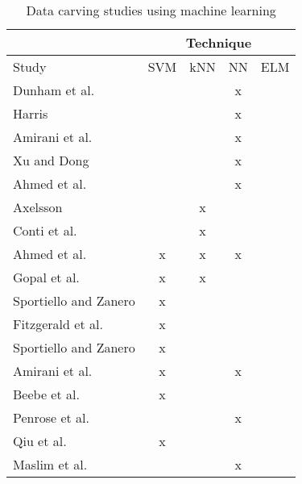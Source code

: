 \begin{table}[!ht]
\caption{Data carving studies using machine learning}
\label{tab:datacarvingstudies}
\begin{tabular}{l|c|c|c|c}

                                & \multicolumn{4}{c}{Technique} \\ \hline
Study                                     & SVM    & kNN    & NN   & ELM   \\ \hline
\hline
Dunham et al. \cite{dunham_classifying_2005} &        &        & x    &       \\ \hline
Harris \cite{harris_using_2007}              &        &        & x    &       \\ \hline
Amirani et al. \cite{amirani_new_2008}       &        &        & x    &       \\ \hline
Xu and Dong \cite{xu_reassembling_2009}      &        &        & x    &       \\ \hline
Ahmed et al. \cite{ahmed_content-based_2010} &        &        & x    &       \\ \hline
Axelsson \cite{axelsson_normalised_2010}     &        & x      &      &       \\ \hline
Conti et al. \cite{conti_automated_2010}     &        & x      &      &       \\ \hline
Ahmed et al. \cite{ahmed_fast_2011}          & x      & x      & x    &       \\ \hline
Gopal et al. \cite{gopal_statistical_2011}   & x      & x      &      &       \\ \hline
Sportiello and Zanero \cite{sportiello_file_2011} & x &        &      &       \\ \hline
Fitzgerald et al. \cite{fitzgerald_using_2012} & x    &        &      &       \\ \hline
Sportiello and Zanero \cite{sportiello_context-based_2012} & x  &  &  &       \\ \hline
Amirani et al. \cite{amirani_feature-based_2013} & x  &        & x    &       \\ \hline
Beebe et al. \cite{beebe_sceadan:_2013}      & x      &        &      &       \\ \hline
Penrose et al. \cite{penrose_approaches_2013} &       &        & x    &       \\ \hline
Qiu et al. \cite{qiu_new_2014}               & x      &        &      &       \\ \hline
Maslim et al. \cite{maslim_distributed_2014} &        &        & x    &       \\ \hline

\end{tabular}
\end{table}
